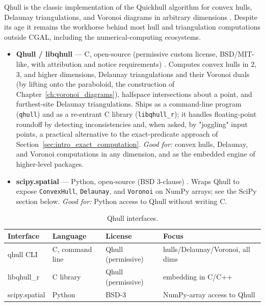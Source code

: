 Qhull is the classic implementation of the Quickhull algorithm for
convex hulls, Delaunay triangulations, and Voronoi diagrams in arbitrary
dimensions \cite{barber1996}. Despite its age it remains the workhorse
behind most hull and triangulation computations outside CGAL, including
the numerical-computing ecosystems.

\begin{itemize}
  \item \textbf{Qhull / libqhull} --- C, open-source (permissive custom
    license, BSD/MIT-like, with attribution and notice requirements)
    \cite{barber1996}. Computes convex hulls in 2, 3, and higher
    dimensions, Delaunay triangulations and their Voronoi duals (by
    lifting onto the paraboloid, the construction of
    Chapter~\ref{ch:voronoi_diagrams}), halfspace intersections about a
    point, and furthest-site Delaunay triangulations. Ships as a
    command-line program (\texttt{qhull}) and as a re-entrant C library
    (\texttt{libqhull\_r}); it handles floating-point roundoff by
    detecting inconsistencies and, when asked, by "joggling" input
    points, a practical alternative to the exact-predicate approach of
    Section~\ref{sec:intro_exact_computation}. \emph{Good for:} convex
    hulls, Delaunay, and Voronoi computations in any dimension, and as
    the embedded engine of higher-level packages.
  \item \textbf{scipy.spatial} --- Python, open-source (BSD 3-clause)
    \cite{scipy}. Wraps Qhull to expose \texttt{ConvexHull},
    \texttt{Delaunay}, and \texttt{Voronoi} on NumPy arrays; see the
    SciPy section below. \emph{Good for:} Python access to Qhull without
    writing C.
\end{itemize}

\begin{table}[ht]
\centering
\begin{tabular}{llll}
\hline
\textbf{Interface} & \textbf{Language} & \textbf{License} & \textbf{Focus} \\
\hline
qhull CLI       & C, command line & Qhull (permissive) & hulls/Delaunay/Voronoi, all dims \\
libqhull\_r     & C library        & Qhull (permissive) & embedding in C/C++ \\
scipy.spatial   & Python           & BSD-3             & NumPy-array access to Qhull \\
\hline
\end{tabular}
\caption{Qhull interfaces.}
\label{tbl:appsoft_qhull}
\end{table}

